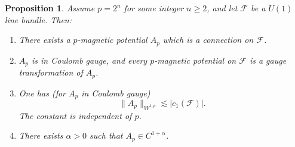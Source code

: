 \documentclass[reqno,11pt]{amsart}
\newtheorem{proposition}[theorem]{Proposition}
\theoremstyle{definition}
\numberwithin{equation}{section}
\begin{document}
\begin{proposition}
Assume $p = 2^n$ for some integer $n \geq 2$, and let $\mathscr F$ be a $U(1)$ line bundle.
Then:
\begin{enumerate}
\item There exists a $p$-magnetic potential $A_p$ which is a connection on $\mathscr F$.
\item $A_p$ is in Coulomb gauge, and every $p$-magnetic potential on $\mathscr F$ is a gauge transformation of $A_p$.
\item One has (for $A_p$ in Coulomb gauge)
\begin{equation}\label{Sobolev bounds for p}
	\|A_p\|_{W^{1, p}} \lesssim |c_1(\mathscr F)|.
\end{equation}
The constant is independent of $p$.
\item There exists $\alpha > 0$ such that $A_p \in C^{1 + \alpha}$.
\end{enumerate}
\end{proposition}
\end{document}
